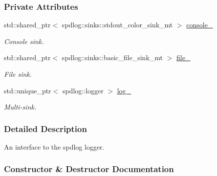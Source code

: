 \subsubsection*{Private Attributes}
\begin{DoxyCompactItemize}
\item 
\mbox{\label{classosse_1_1collaborate_1_1_event_logger_a251a1f450efb2a8b48689dff5056e8cd}} 
std\+::shared\+\_\+ptr$<$ spdlog\+::sinks\+::stdout\+\_\+color\+\_\+sink\+\_\+mt $>$ \hyperlink{classosse_1_1collaborate_1_1_event_logger_a251a1f450efb2a8b48689dff5056e8cd}{console\+\_\+}
\begin{DoxyCompactList}\small\item\em Console sink. \end{DoxyCompactList}\item 
\mbox{\label{classosse_1_1collaborate_1_1_event_logger_a42a6aa81525ec44dcee5b76d8a238e5b}} 
std\+::shared\+\_\+ptr$<$ spdlog\+::sinks\+::basic\+\_\+file\+\_\+sink\+\_\+mt $>$ \hyperlink{classosse_1_1collaborate_1_1_event_logger_a42a6aa81525ec44dcee5b76d8a238e5b}{file\+\_\+}
\begin{DoxyCompactList}\small\item\em File sink. \end{DoxyCompactList}\item 
\mbox{\label{classosse_1_1collaborate_1_1_event_logger_af5ebd14804c7ffd7a584e9a389d47f53}} 
std\+::unique\+\_\+ptr$<$ spdlog\+::logger $>$ \hyperlink{classosse_1_1collaborate_1_1_event_logger_af5ebd14804c7ffd7a584e9a389d47f53}{log\+\_\+}
\begin{DoxyCompactList}\small\item\em Multi-\/sink. \end{DoxyCompactList}\end{DoxyCompactItemize}


\subsubsection{Detailed Description}
An interface to the spdlog logger. 

\subsubsection{Constructor \& Destructor Documentation}
\mbox{\label{classosse_1_1collaborate_1_1_event_logger_a9c87908de9f2673fe6464b59df4082d1}} 
